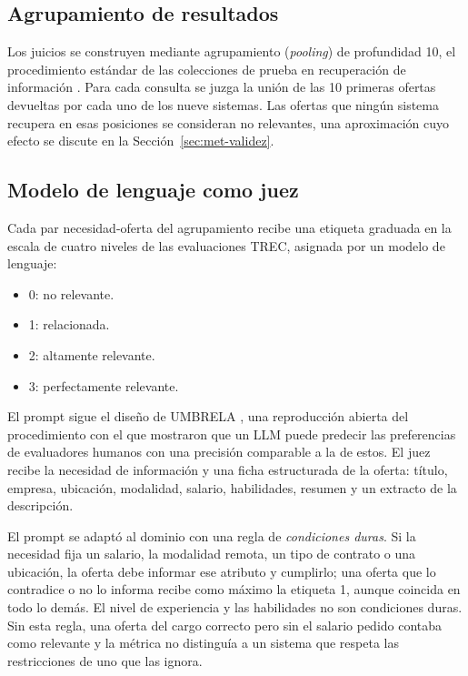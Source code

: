 \subsection{Agrupamiento de resultados}

Los juicios se construyen mediante agrupamiento (\textit{pooling}) de profundidad 10, el procedimiento estándar de las colecciones de prueba en recuperación de información \citep{Sanderson2010}. Para cada consulta se juzga la unión de las 10 primeras ofertas devueltas por cada uno de los nueve sistemas. Las ofertas que ningún sistema recupera en esas posiciones se consideran no relevantes, una aproximación cuyo efecto se discute en la Sección~\ref{sec:met-validez}.

\subsection{Modelo de lenguaje como juez}

Cada par necesidad-oferta del agrupamiento recibe una etiqueta graduada en la escala de cuatro niveles de las evaluaciones TREC, asignada por un modelo de lenguaje:
\begin{itemize}
    \item 0: no relevante.
    \item 1: relacionada.
    \item 2: altamente relevante.
    \item 3: perfectamente relevante.
\end{itemize}
El prompt sigue el diseño de UMBRELA \citep{Upadhyay2024}, una reproducción abierta del procedimiento con el que \citet{Thomas2024} mostraron que un LLM puede predecir las preferencias de evaluadores humanos con una precisión comparable a la de estos. El juez recibe la necesidad de información y una ficha estructurada de la oferta: título, empresa, ubicación, modalidad, salario, habilidades, resumen y un extracto de la descripción.

El prompt se adaptó al dominio con una regla de \emph{condiciones duras}. Si la necesidad fija un salario, la modalidad remota, un tipo de contrato o una ubicación, la oferta debe informar ese atributo y cumplirlo; una oferta que lo contradice o no lo informa recibe como máximo la etiqueta 1, aunque coincida en todo lo demás. El nivel de experiencia y las habilidades no son condiciones duras. Sin esta regla, una oferta del cargo correcto pero sin el salario pedido contaba como relevante y la métrica no distinguía a un sistema que respeta las restricciones de uno que las ignora.

